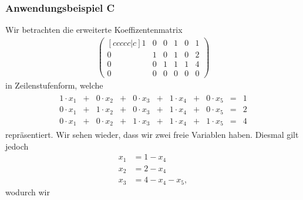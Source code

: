\subsubsection*{Anwendungsbeispiel C}
Wir betrachten die erweiterte Koeffizentenmatrix
\begin{align*}
\begin{pmatrix}[ccccc|c]
1 & 0 & 0 & 1 & 0 & 1\\
0 & 1 & 0 & 1 & 0 & 2\\
0 & 0 & 1 & 1 & 1 & 4\\
0 & 0 & 0 & 0 & 0 & 0
\end{pmatrix}
\end{align*}
in Zeilenstufenform, welche
\begin{align*}
\begin{matrix}
1 \cdot x_1 & +& 0 \cdot x_2 & + & 0 \cdot x_3 & + & 1 \cdot x_4 & + & 0 \cdot x_5 & = & 1\\
0 \cdot x_1 & +& 1 \cdot  x_2 & + & 0 \cdot x_3 & + & 1 \cdot x_4 & + & 0 \cdot x_5 & = & 2\\
0 \cdot x_1 & +& 0 \cdot x_2 & + & 1 \cdot x_3 & + & 1 \cdot x_4 & + & 1 \cdot x_5 & = & 4
\end{matrix}
\end{align*}
repräsentiert.
Wir sehen wieder, dass wir zwei freie Variablen haben.
Diesmal gilt jedoch
\begin{align*}
x_1 &= 1 - x_4\\
x_2 &= 2 - x_4\\
x_3 &= 4 -x_4 -x_5,
\end{align*}
wodurch wir
